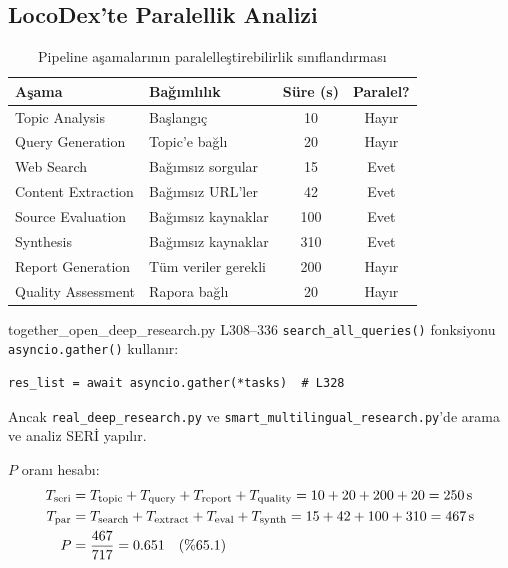 \subsection{LocoDex'te Paralellik Analizi}

\begin{table}[H]
\centering
\caption{Pipeline a\c{s}amalar{\i}n{\i}n paralelle\c{s}tirebilirlik s{\i}n{\i}fland{\i}rmas{\i}}
\label{tab:parallelism}
\begin{tabularx}{\textwidth}{lXcc}
\toprule
\color{chapterBlue}\textbf{A\c{s}ama} & \color{chapterBlue}\textbf{Ba\u{g}{\i}ml{\i}l{\i}k} & \color{chapterBlue}\textbf{S\"{u}re (s)} & \color{chapterBlue}\textbf{Paralel?} \\
\midrule
Topic Analysis    & Ba\c{s}lang{\i}\c{c}          & 10   & \color{codeRed}Hay{\i}r \\
Query Generation  & Topic'e ba\u{g}l{\i}      & 20   & \color{codeRed}Hay{\i}r \\
Web Search        & Ba\u{g}{\i}ms{\i}z sorgular  & 15   & \color{codeGreen}Evet \\
Content Extraction & Ba\u{g}{\i}ms{\i}z URL'ler & 42   & \color{codeGreen}Evet \\
Source Evaluation  & Ba\u{g}{\i}ms{\i}z kaynaklar & 100 & \color{codeGreen}Evet \\
Synthesis         & Ba\u{g}{\i}ms{\i}z kaynaklar  & 310  & \color{codeGreen}Evet \\
Report Generation & T\"{u}m veriler gerekli & 200  & \color{codeRed}Hay{\i}r \\
Quality Assessment & Rapora ba\u{g}l{\i}      & 20   & \color{codeRed}Hay{\i}r \\
\bottomrule
\end{tabularx}
\end{table}

\begin{kodref}{together\_open\_deep\_research.py L308--336}
\texttt{search\_all\_queries()} fonksiyonu \texttt{asyncio.gather()} kullan{\i}r:
\begin{lstlisting}
res_list = await asyncio.gather(*tasks)  # L328
\end{lstlisting}
Ancak \texttt{real\_deep\_research.py} ve \texttt{smart\_multilingual\_research.py}'de arama ve analiz SER\.{I} yap{\i}l{\i}r.
\end{kodref}

$P$ oran{\i} hesab{\i}:
\begin{align}
T_{\text{seri}} &= T_{\text{topic}} + T_{\text{query}} + T_{\text{report}} + T_{\text{quality}} = 10 + 20 + 200 + 20 = 250\text{\,s} \notag \\
T_{\text{par}}  &= T_{\text{search}} + T_{\text{extract}} + T_{\text{eval}} + T_{\text{synth}} = 15 + 42 + 100 + 310 = 467\text{\,s} \notag \\
P &= \frac{467}{717} = 0.651 \quad (\%65.1) \label{eq:P_ratio}
\end{align}

